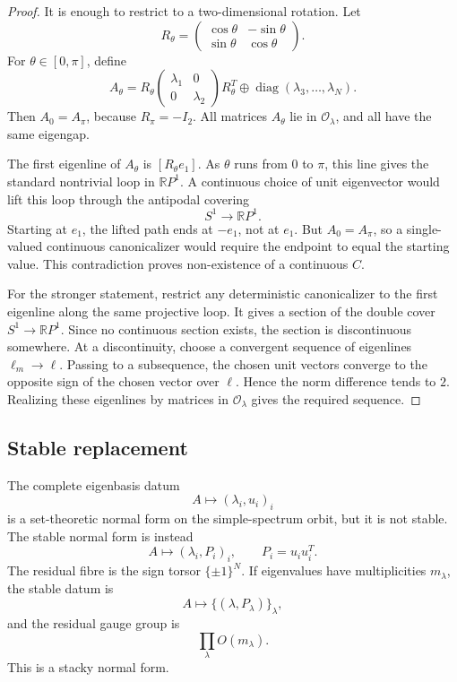 \documentclass[11pt]{article}
\begin{document}
\begin{proof}
It is enough to restrict to a two-dimensional rotation. Let
\[
R_\theta=
\begin{pmatrix}
\cos\theta&-\sin\theta\\
\sin\theta&\cos\theta
\end{pmatrix}.
\]
For \(\theta\in[0,\pi]\), define
\[
A_\theta
=
R_\theta
\begin{pmatrix}
\lambda_1&0\\
0&\lambda_2
\end{pmatrix}
R_\theta^T
\oplus
\operatorname{diag}(\lambda_3,\ldots,\lambda_N).
\]
Then \(A_0=A_\pi\), because \(R_\pi=-I_2\). All matrices \(A_\theta\) lie in \(\mathcal O_\lambda\), and all have the same eigengap.

The first eigenline of \(A_\theta\) is \([R_\theta e_1]\). As \(\theta\) runs from \(0\) to \(\pi\), this line gives the standard nontrivial loop in \(\mathbb RP^1\). A continuous choice of unit eigenvector would lift this loop through the antipodal covering
\[
S^1\to\mathbb RP^1.
\]
Starting at \(e_1\), the lifted path ends at \(-e_1\), not at \(e_1\). But \(A_0=A_\pi\), so a single-valued continuous canonicalizer would require the endpoint to equal the starting value. This contradiction proves non-existence of a continuous \(C\).

For the stronger statement, restrict any deterministic canonicalizer to the first eigenline along the same projective loop. It gives a section of the double cover \(S^1\to\mathbb RP^1\). Since no continuous section exists, the section is discontinuous somewhere. At a discontinuity, choose a convergent sequence of eigenlines \(\ell_m\to\ell\). Passing to a subsequence, the chosen unit vectors converge to the opposite sign of the chosen vector over \(\ell\). Hence the norm difference tends to \(2\). Realizing these eigenlines by matrices in \(\mathcal O_\lambda\) gives the required sequence.
\end{proof}

\subsection{Stable replacement}

The complete eigenbasis datum
\[
A\longmapsto (\lambda_i,u_i)_i
\]
is a set-theoretic normal form on the simple-spectrum orbit, but it is not stable. The stable normal form is instead
\[
A\longmapsto (\lambda_i,P_i)_i,
\qquad
P_i=u_i u_i^T.
\]
The residual fibre is the sign torsor \(\{\pm1\}^N\). If eigenvalues have multiplicities \(m_\lambda\), the stable datum is
\[
A\longmapsto \{(\lambda,P_\lambda)\}_\lambda,
\]
and the residual gauge group is
\[
\prod_\lambda O(m_\lambda).
\]
This is a stacky normal form.
\end{document}
